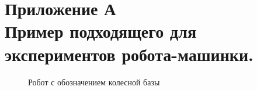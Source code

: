 \documentclass[12pt,a4paper,openany]{extarticle}
\begin{document}
\newpage
\section*{Приложение А\\
Пример подходящего для экспериментов робота-машинки.}
\vspace{1cm}
\begin{figure}[h!]
	\vspace{-0.5cm}
	\caption{Робот с обозначением колесной базы}
	\label{fig:first_append_fig}
\end{figure}	
\end{document}
